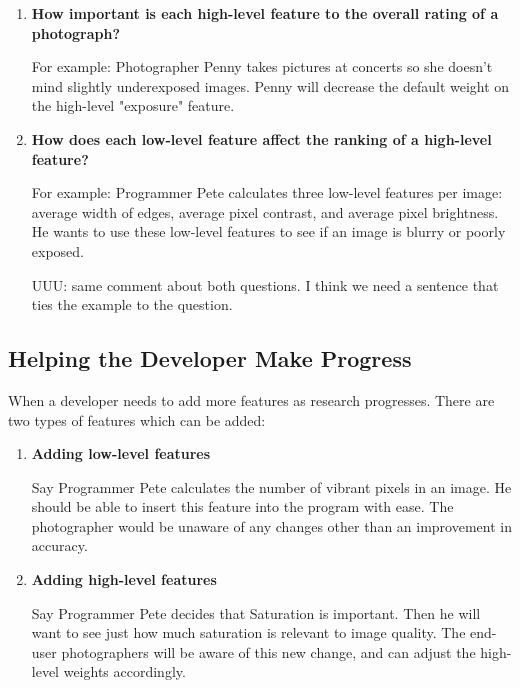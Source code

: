 \documentclass[11pt,letter]{article}
\begin{document}
\begin{enumerate}
\item \textbf{How important is each high-level feature to the overall rating of a photograph?}


For example: Photographer Penny takes pictures at concerts so she doesn't mind slightly underexposed images. Penny will decrease the default weight on the high-level "exposure" feature.

\item \textbf{How does each low-level feature affect the ranking of a high-level feature?}


For example: Programmer Pete calculates three low-level features per image: average width of edges, average pixel contrast, and average pixel brightness. He wants to use these low-level features to see if an image is blurry or poorly exposed.

UUU: same comment about both questions. I think we need a sentence that ties the example to the question.

\end{enumerate}

\subsection{Helping the Developer Make Progress}
\label{easeofprogramming}
When a developer needs to add more features as research progresses. There are two types of features which can be added:
\begin{enumerate}
\item \textbf{Adding low-level features}

Say Programmer Pete calculates the number of vibrant pixels in an image. He should be able to insert this feature into the program with ease. The photographer would be unaware of any changes other than an improvement in accuracy.

\item \textbf{Adding high-level features}

Say Programmer Pete decides that Saturation is important. Then he will want to see just how much saturation is relevant to image quality. The end-user photographers will be aware of this new change, and can adjust the high-level weights accordingly.
\end{enumerate}
\end{document}

